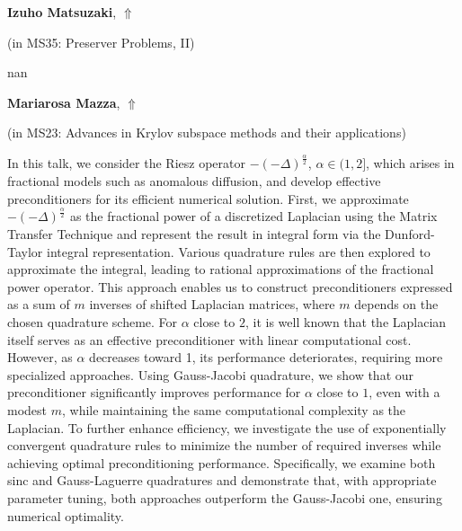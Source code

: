 \documentclass[ILAS2025-program.tex]{subfiles}
\begin{document}
     \hypertarget{down0249}{}\begin{ilasabstract}
    
    \textbf{Izuho Matsuzaki},  \hfill \hyperlink{up0249}{$\Uparrow$}
    
    (in {\color{mstitle}MS35: Preserver Problems, II})
        
        \mtskip
    nan\end{ilasabstract}
     \hypertarget{down0237}{}\begin{ilasabstract}
    
    \textbf{Mariarosa Mazza},  \hfill \hyperlink{up0237}{$\Uparrow$}
    
    (in {\color{mstitle}MS23: Advances in Krylov subspace methods and their applications})
        
        \mtskip
    In this talk, we consider the Riesz operator \( -(- \Delta)^{\frac{\alpha}{2}} \), \(\alpha \in (1, 2]\), which arises in fractional models such as anomalous diffusion, and develop effective preconditioners for its efficient numerical solution. First, we approximate \( -(-\Delta)^{\frac{\alpha}{2}} \) as the fractional power of a discretized Laplacian using the Matrix Transfer Technique and represent the result in integral form via the Dunford-Taylor integral representation. Various quadrature rules are then explored to approximate the integral, leading to rational approximations of the fractional power operator.  
This approach enables us to construct preconditioners expressed as a sum of \( m \) inverses of shifted Laplacian matrices, where \( m \) depends on the chosen quadrature scheme. For \(\alpha\) close to $2$, it is well known that the Laplacian itself serves as an effective preconditioner with linear computational cost. However, as \(\alpha\) decreases toward 1, its performance deteriorates, requiring more specialized approaches. Using Gauss-Jacobi quadrature, we show that our preconditioner significantly improves performance for \(\alpha\) close to $1$, even with a modest \( m \), while maintaining the same computational complexity as the Laplacian.  
To further enhance efficiency, we investigate the use of exponentially convergent quadrature rules to minimize the number of required inverses while achieving optimal preconditioning performance. Specifically, we examine both sinc and Gauss-Laguerre quadratures and demonstrate that, with appropriate parameter tuning, both approaches outperform the Gauss-Jacobi one, ensuring numerical optimality.\end{ilasabstract}
\end{document}
